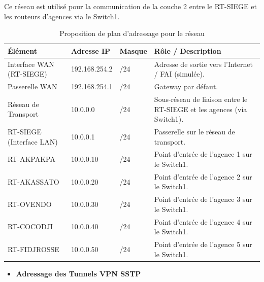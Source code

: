 Ce réseau est utilisé pour la communication de la couche 2 entre le RT-SIEGE et les
routeurs d'agences via le Switch1.
\begin{table}[H]
\centering
\caption{Proposition de plan d’adressage pour le réseau}
\label{tab:adressage_wan}
\renewcommand{\arraystretch}{1.4}
\begin{tabular}{|p{4cm}|p{4cm}|p{3cm}|p{5cm}|}
\hline
\textbf{Élément} & \textbf{Adresse \gls{IP}} & \textbf{Masque} & \textbf{Rôle / Description} \\
\hline
Interface \gls{WAN} (RT-SIEGE) & 192.168.254.2 & /24 &
Adresse de sortie vers l'Internet / FAI (simulée). \\
\hline
Passerelle \gls{WAN} & 192.168.254.1 & /24 &
Gateway par défaut. \\
\hline
Réseau de Transport & 10.0.0.0 & /24 &
Sous-réseau de liaison entre le RT-SIEGE et les agences (via Switch1). \\
\hline
RT-SIEGE (Interface \gls{LAN}) & 10.0.0.1 & /24 &
Passerelle sur le réseau de transport. \\
\hline
RT-AKPAKPA & 10.0.0.10 & /24 &
Point d'entrée de l'agence 1 sur le Switch1. \\
\hline
RT-AKASSATO & 10.0.0.20 & /24 &
Point d'entrée de l'agence 2 sur le Switch1. \\
\hline
RT-OVENDO & 10.0.0.30 & /24 &
Point d'entrée de l'agence 3 sur le Switch1. \\
\hline
RT-COCODJI & 10.0.0.40 & /24 &
Point d'entrée de l'agence 4 sur le Switch1. \\
\hline
RT-FIDJROSSE & 10.0.0.50 & /24 &
Point d'entrée de l'agence 5 sur le Switch1. \\
\hline
\end{tabular}
\end{table}

\begin{itemize}
\item \textbf{Adressage des Tunnels \gls{VPN} \gls{SSTP}}
\end{itemize}

